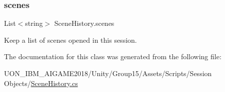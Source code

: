 \subsubsection{\texorpdfstring{scenes}{scenes}}
{\footnotesize\ttfamily List$<$string$>$ Scene\+History.\+scenes}



Keep a list of scenes opened in this session. 



The documentation for this class was generated from the following file\+:\begin{DoxyCompactItemize}
\item 
U\+O\+N\+\_\+\+I\+B\+M\+\_\+\+A\+I\+G\+A\+M\+E2018/\+Unity/\+Group15/\+Assets/\+Scripts/\+Session Objects/\mbox{\hyperlink{_scene_history_8cs}{Scene\+History.\+cs}}\end{DoxyCompactItemize}
